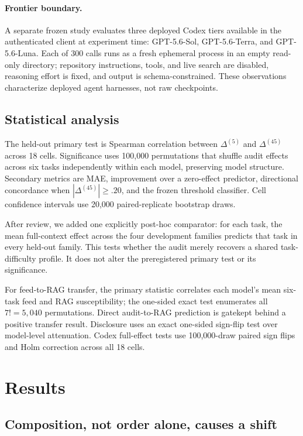 \documentclass{article}
\newcommand{\model}[1]{\textsf{#1}}
\begin{document}
\paragraph{Frontier boundary.}
A separate frozen study evaluates three deployed Codex tiers available in the
authenticated client at experiment time: \model{GPT-5.6-Sol},
\model{GPT-5.6-Terra}, and \model{GPT-5.6-Luna}. Each of 300 calls runs as a
fresh ephemeral process in an empty read-only directory; repository
instructions, tools, and live search are disabled, reasoning effort is fixed,
and output is schema-constrained. These observations characterize deployed
agent harnesses, not raw checkpoints.

\subsection{Statistical analysis}

The held-out primary test is Spearman correlation between $\Delta^{(5)}$ and
$\Delta^{(45)}$ across 18 cells. Significance uses 100,000 permutations that
shuffle audit effects across six tasks independently within each model,
preserving model structure. Secondary metrics are MAE, improvement over a
zero-effect predictor, directional concordance when
$|\Delta^{(45)}|\geq .20$, and the frozen threshold classifier. Cell
confidence intervals use 20,000 paired-replicate bootstrap draws.

After review, we added one explicitly post-hoc comparator: for each task, the
mean full-context effect across the four development families predicts that
task in every held-out family. This tests whether the audit merely recovers a
shared task-difficulty profile. It does not alter the preregistered primary
test or its significance.

For feed-to-RAG transfer, the primary statistic correlates each model's mean
six-task feed and RAG susceptibility; the one-sided exact test enumerates all
$7!=5{,}040$ permutations. Direct audit-to-RAG prediction is gatekept behind
a positive transfer result. Disclosure uses an exact one-sided sign-flip test
over model-level attenuation. Codex full-effect tests use 100,000-draw paired
sign flips and Holm correction across all 18 cells.

\section{Results}
\label{sec:results}

\subsection{Composition, not order alone, causes a shift}
\end{document}
